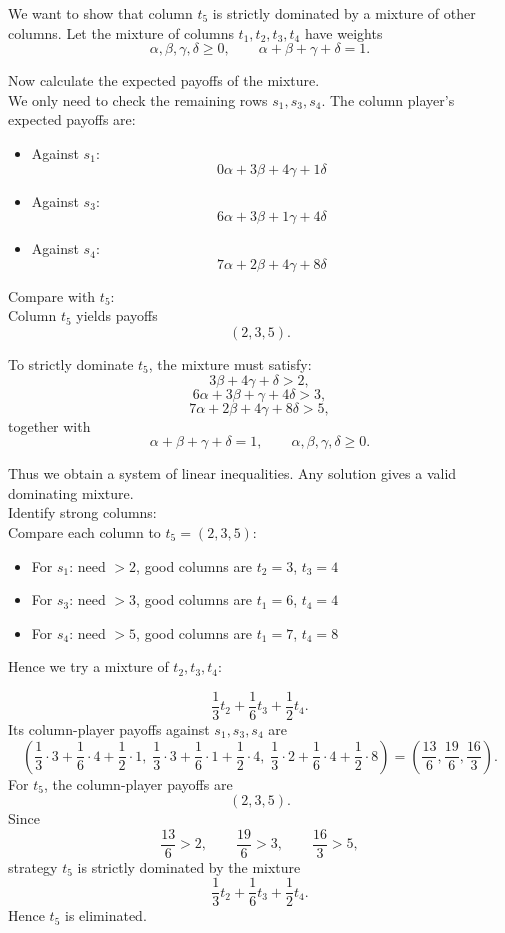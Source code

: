 We want to show that column \(t_5\) is strictly dominated by a mixture of other columns.
Let the mixture of columns \(t_1, t_2, t_3, t_4\) have weights
\[
\alpha, \beta, \gamma, \delta \ge 0,
\qquad
\alpha + \beta + \gamma + \delta = 1.
\]

Now calculate the expected payoffs of the mixture. \\

We only need to check the remaining rows \(s_1, s_3, s_4\).
The column player's expected payoffs are:

\begin{itemize}
\item Against \(s_1\):
\[
0\alpha + 3\beta + 4\gamma + 1\delta
\]

\item Against \(s_3\):
\[
6\alpha + 3\beta + 1\gamma + 4\delta
\]

\item Against \(s_4\):
\[
7\alpha + 2\beta + 4\gamma + 8\delta
\]
\end{itemize}

Compare with \(t_5\): \\

Column \(t_5\) yields payoffs
\[
(2,3,5).
\]

To strictly dominate \(t_5\), the mixture must satisfy:
\[
3\beta + 4\gamma + \delta > 2,
\]
\[
6\alpha + 3\beta + \gamma + 4\delta > 3,
\]
\[
7\alpha + 2\beta + 4\gamma + 8\delta > 5,
\]
together with
\[
\alpha + \beta + \gamma + \delta = 1,
\qquad
\alpha, \beta, \gamma, \delta \ge 0.
\]

Thus we obtain a system of linear inequalities. Any solution gives a valid dominating mixture.
\\


Identify strong columns: \\

Compare each column to \(t_5 = (2,3,5)\):

\begin{itemize}
\item For \(s_1\): need \(>2\), good columns are \(t_2 = 3\), \(t_3 = 4\)
\item For \(s_3\): need \(>3\), good columns are \(t_1 = 6\), \(t_4 = 4\)
\item For \(s_4\): need \(>5\), good columns are \(t_1 = 7\), \(t_4 = 8\)
\end{itemize}

Hence we try a mixture of \(t_2, t_3, t_4\):

\[
\frac13 t_2+\frac16 t_3+\frac12 t_4.
\]
Its column-player payoffs against \(s_1,s_3,s_4\) are
\[
\left(\frac13\cdot 3+\frac16\cdot 4+\frac12\cdot 1,\;
\frac13\cdot 3+\frac16\cdot 1+\frac12\cdot 4,\;
\frac13\cdot 2+\frac16\cdot 4+\frac12\cdot 8\right)
=
\left(\frac{13}{6},\frac{19}{6},\frac{16}{3}\right).
\]
For \(t_5\), the column-player payoffs are
\[
(2,3,5).
\]
Since
\[
\frac{13}{6}>2,\qquad \frac{19}{6}>3,\qquad \frac{16}{3}>5,
\]
strategy \(t_5\) is strictly dominated by the mixture
\[
\frac13 t_2+\frac16 t_3+\frac12 t_4.
\]
Hence \(t_5\) is eliminated.

